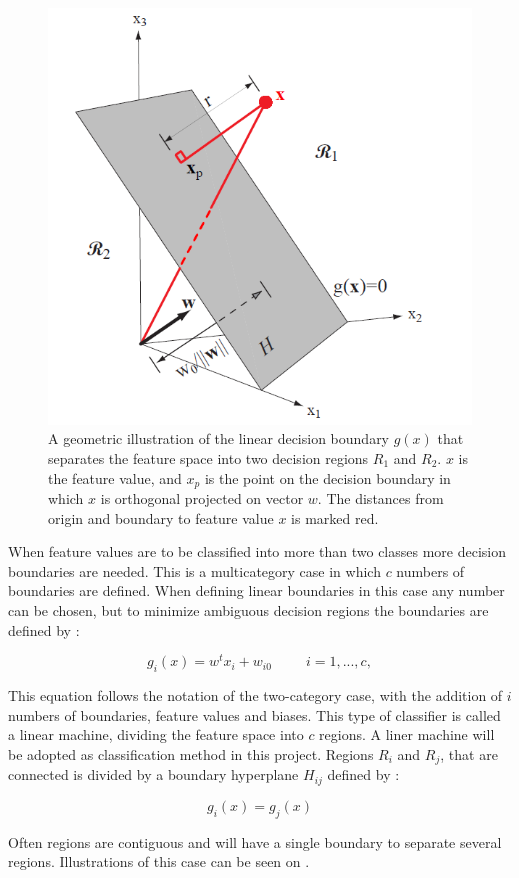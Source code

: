 \begin{figure}[H]                 
	\includegraphics[width=.4\textwidth]{figures/xBackground/geolda}  
	\caption{A geometric illustration of the linear decision boundary $g(x)$ that separates the feature space into two decision regions $R_1$ and $R_2$. $x$ is the feature value, and $x_p$ is the point on the decision boundary in which $x$ is orthogonal projected on vector $w$. The distances from origin and boundary to feature value $x$ is marked red. \cite{Duda2000}}
	\label{fig:geolda} 
\end{figure}

When feature values are to be classified into more than two classes more decision boundaries are needed. This is a multicategory case in which $c$ numbers of boundaries are defined. When defining linear boundaries in this case any number can be chosen, but to minimize ambiguous decision regions the boundaries are defined by \cite{Duda2000}:

\begin{equation} \label{eq:multicase}
g_{i}(x) = w^tx_{i} +w_{i0} ~~~~~~~~~~~ i = 1,...,c,
\end{equation}

This equation follows the notation of the two-category case, with the addition of $i$ numbers of boundaries, feature values and biases. This type of classifier is called a linear machine, dividing the feature space into $c$ regions. A liner machine will be adopted as classification method in this project. Regions $R_i$ and $R_j$, that are connected is divided by a boundary hyperplane $H_{ij}$ defined by \cite{Duda2000}:

\begin{equation}
g_i(x) = g_j(x)
\end{equation}

Often regions are contiguous and will have a single boundary to separate several regions. \cite{Duda2000} Illustrations of this case can be seen on . 

